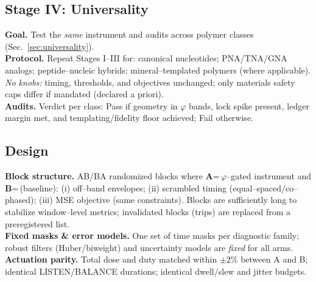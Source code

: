 \documentclass[11pt]{article}
\begin{document}
\subsection{Stage IV: Universality}\label{sec:stage4}
\textbf{Goal.} Test the \emph{same} instrument and audits across polymer classes (Sec.~\ref{sec:universality}).\\
\textbf{Protocol.} Repeat Stages I–III for: canonical nucleotides; PNA/TNA/GNA analogs; peptide–nucleic hybrids; mineral–templated polymers (where applicable). \emph{No knobs:} timing, thresholds, and objectives unchanged; only materials safety caps differ if mandated (declared a priori).\\
\textbf{Audits.} Verdict per class: \textsf{Pass} if geometry in $\varphi$ bands, lock spike present, ledger margin met, and templating/fidelity floor achieved; \textsf{Fail} otherwise.

\subsection{Design}\label{sec:design}
\textbf{Block structure.} AB/BA randomized blocks where \textbf{A}=\,$\varphi$--gated instrument and \textbf{B}=\,(baseline): (i) off--band envelopes; (ii) scrambled timing (equal--spaced/co--phased); (iii) MSE objective (same constraints). Blocks are sufficiently long to stabilize window--level metrics; invalidated blocks (trips) are replaced from a preregistered list.\\
\textbf{Fixed masks \& error models.} One set of time masks per diagnostic family; robust filters (Huber/biweight) and uncertainty models are \emph{fixed} for all arms.\\
\textbf{Actuation parity.} Total dose and duty matched within $\pm 2\%$ between A and B; identical LISTEN/BALANCE durations; identical dwell/slew and jitter budgets.
\end{document}
